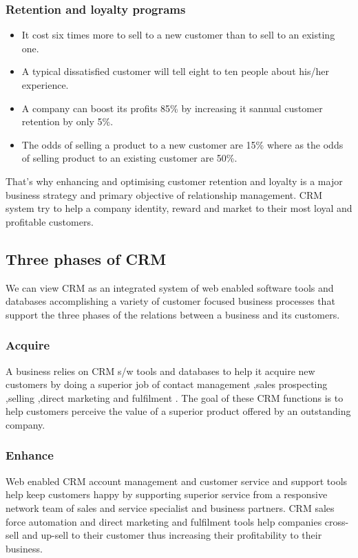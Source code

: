 \documentclass[twocolumn, 12pt, a4paper]{article}
\begin{document}
\subsubsection{Retention and loyalty programs}
\begin{itemize}
  \item It cost six times more to sell to a new customer than to sell to an existing one.
  \item A typical dissatisfied customer will tell eight to ten people about his/her experience.
  \item A company can boost its profits 85\% by increasing it sannual customer retention by only 5\%.
  \item The odds of selling a product to a new customer are 15\% where as the odds of selling product to an existing customer are 50\%.
\end{itemize}

That’s why enhancing and optimising customer retention and loyalty is a major business strategy and primary objective of relationship management. CRM system try to help a company identity, reward and market to their most loyal and profitable customers.

\subsection{Three phases of CRM}
We can view CRM as an integrated system of web enabled software tools and databases accomplishing a variety of customer focused business processes that support the three phases of the relations between a business and its customers.

\subsubsection{Acquire}
A business relies on CRM s/w tools and databases to help it acquire new customers by doing a superior job of  contact management ,sales prospecting ,selling ,direct marketing and fulfilment . The goal of these CRM functions is to help customers perceive the value of a superior product offered by an outstanding company.

\subsubsection{Enhance}
Web enabled CRM account management and customer service and support tools help keep customers happy by supporting superior service from a responsive network team of sales and service specialist and business partners. CRM sales force automation and direct marketing and fulfilment tools help companies cross-sell and up-sell to their customer thus increasing their profitability to their business.
\end{document}
